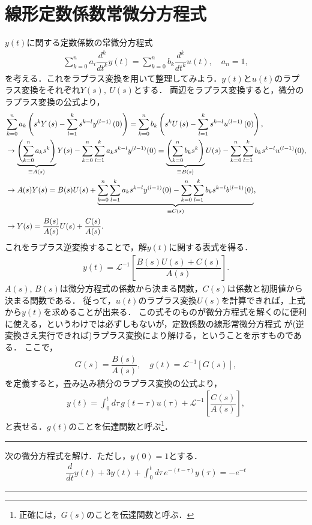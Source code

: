\section{線形定数係数常微分方程式}
%
$y(t)$に関する定数係数の常微分方程式
\begin{align}
 \sum_{k=0}^{n}a_i\dfrac{d^{k}}{dt^{k}}y(t) = \sum_{k=0}^{n}b_{k}\dfrac{d^k}{dt^k}u(t),\quad a_n=1, 
\end{align}
を考える．これをラプラス変換を用いて整理してみよう．$y(t)$と$u(t)$のラプラス変換をそれぞれ$Y(s),~U(s)$とする．
両辺をラプラス変換すると，微分のラプラス変換の公式より，
\begin{align}
   &\sum_{k=0}^{n}a_{k}\left(s^{k}Y\left(s\right)-\sum_{l=1}^{k}s^{k-l}y^{\left(l-1\right)}\left(0\right)\right) =\sum_{k=0}^{n}b_{k}\left(s^{k}U\left(s\right)-\sum_{l=1}^{k}s^{k-l}u^{\left(l-1\right)}\left(0\right)\right), \notag \\
   &\rightarrow \underbrace{\left(\sum_{k=0}^{n}a_{k}s^{k}\right)}_{\equiv A(s)} Y (s) 
    - \sum_{k=0}^{n}\sum_{l=1}^{k}a_{k}s^{k-l}y^{(l-1)}(0) 
   = \underbrace{\left(\sum_{k=0}^{n}b_{k}s^{k}\right)}_{\equiv B(s)}U(s) - \sum_{k=0}^{n}\sum_{l=1}^{k}b_{k}s^{k-l}u^{(l-1)}(0), \notag \\
   &\rightarrow A(s)Y(s) = B(s)U(s) + 
   \underbrace{\sum_{k=0}^{n}\sum_{l=1}^{k}a_{k}s^{k-l}y^{(l-1)}(0) - \sum_{k=0}^{n}\sum_{l=1}^{k}b_{k}s^{k-l}b^{(l-1)}(0)}_{\equiv C(s)}, \notag \\
   &\rightarrow Y(s) = \dfrac{B(s)}{A(s)}U(s) + \dfrac{C(s)}{A(s)}.
\end{align}
これをラプラス逆変換することで，解$y(t)$に関する表式を得る．
\begin{align}
 y(t) = \mathcal{L}^{-1}\left[\dfrac{B(s)U(s)+C(s)}{A(s)}\right]. 
\end{align}
$A(s)$, $B(s)$は微分方程式の係数から決まる関数，$C(s)$は係数と初期値から決まる関数である．
従って，$u(t)$のラプラス変換$U(s)$を計算できれば，上式から$y(t)$を求めることが出来る．
この式そのものが微分方程式を解くのに便利に使える，というわけでは必ずしもないが，定数係数の線形常微分方程式
が(逆変換さえ実行できれば)ラプラス変換により解ける，ということを示すものである．
ここで，
\begin{align}
  G(s) = \dfrac{B(s)}{A(s)},\quad g(t) = \mathcal{L}^{-1}\left[G(s)\right],
\end{align}
を定義すると，畳み込み積分のラプラス変換の公式より，
\begin{align}
 y(t) = \int_{0}^{t}d\tau\,g(t-\tau)u(\tau) + \mathcal{L}^{-1}\left[\dfrac{C(s)}{A(s)}\right], 
\end{align}
と表せる．$g(t)$のことを伝達関数と呼ぶ\footnote{正確には，$G(s)$のことを伝達関数と呼ぶ．}．
%
\newpage
%
\hrule
\reidai
次の微分方程式を解け．ただし，$y(0)=1$とする．
\begin{align}
 \dfrac{d}{dt}y(t) + 3y(t) + \int_{0}^{t}d \tau\, e^{-(t-\tau)}y(\tau) = -e^{-t} 
\end{align}
\hrule
\vspace*{.2cm}

